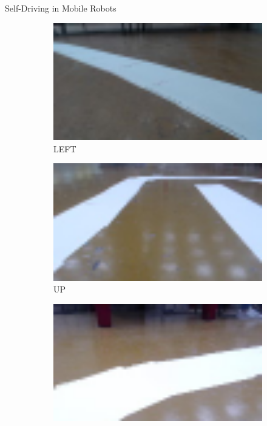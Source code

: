 \documentclass[final,hyperref={pdfpagelabels=false},notheorems]{beamer}
\theoremstyle{thesisstyle}
\begin{document}
\begin{frame}[t]
\begin{columns}[t]
\begin{column}{.5225\textwidth}
\begin{block}{Self-Driving in Mobile Robots}
      \begin{figure}
        \begin{subfigure}{0.3\linewidth}
          \centering\includegraphics[width=1.0\textwidth]{imgs/sample_left.png}
          \captionsetup{justification=centering}
          \caption*{LEFT}
        \end{subfigure}
        \begin{subfigure}{0.3\linewidth}
          \centering\includegraphics[width=1.0\textwidth]{imgs/sample_up.png}
          \captionsetup{justification=centering}
          \caption*{UP}
        \end{subfigure}
        \begin{subfigure}{0.3\linewidth}
          \centering\includegraphics[width=1.0\textwidth]{imgs/sample_right.png}

\end{subfigure}
\end{figure}
\end{block}
\end{column}
\end{columns}
\end{frame}
\end{document}
